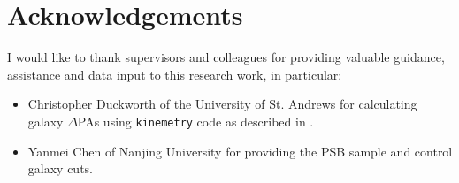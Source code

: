 \section*{Acknowledgements} %

I would like to thank supervisors and colleagues for providing valuable guidance, assistance and data input to this research work, in particular:
\begin{itemize}
    \item Christopher Duckworth of the University of St. Andrews for calculating galaxy $\Delta$PAs using \texttt{kinemetry} code as described in \citet{2011MNRAS.414.2923K}.
    \item Yanmei Chen of Nanjing University for providing the PSB sample and control galaxy cuts.
\end{itemize}
